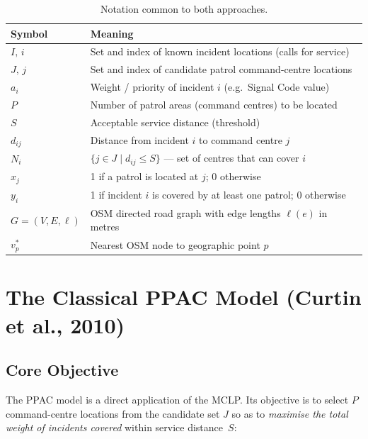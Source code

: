 \documentclass[12pt]{article}
\begin{document}
\begin{table}[h]
\centering
\renewcommand{\arraystretch}{1.25}
\begin{tabularx}{\textwidth}{@{} l X @{}}
\toprule
Symbol & Meaning \\ \midrule
$I,\,i$          & Set and index of known incident locations (calls for service) \\
$J,\,j$          & Set and index of candidate patrol command-centre locations \\
$a_i$            & Weight / priority of incident $i$ (e.g.\ Signal Code value) \\
$P$              & Number of patrol areas (command centres) to be located \\
$S$              & Acceptable service distance (threshold) \\
$d_{ij}$         & Distance from incident $i$ to command centre $j$ \\
$N_i$            & $\{j \in J \mid d_{ij} \le S\}$ --- set of centres that can cover $i$ \\
$x_j$            & 1 if a patrol is located at $j$; 0 otherwise \\
$y_i$            & 1 if incident $i$ is covered by at least one patrol; 0 otherwise \\
$G=(V,E,\ell)$   & OSM directed road graph with edge lengths $\ell(e)$ in metres \\
$v^*_p$          & Nearest OSM node to geographic point $p$ \\
\bottomrule
\end{tabularx}
\caption{Notation common to both approaches.}
\end{table}

\section{The Classical PPAC Model (Curtin et al., 2010)}

\subsection{Core Objective}

The PPAC model is a direct application of the MCLP.  Its objective is to
select $P$ command-centre locations from the candidate set $J$ so as to
\emph{maximise the total weight of incidents covered} within service
distance~$S$:
\end{document}

